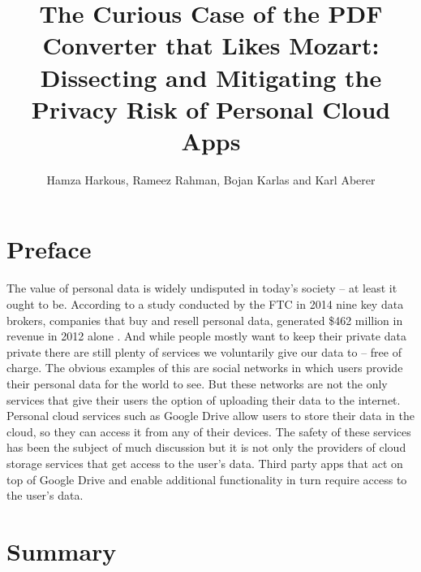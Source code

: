 \documentclass[11pt,twocolumn,a4paper,DIV=calc]{scrartcl}
\begin{document}
\title{The Curious Case of the PDF Converter that Likes Mozart: Dissecting and Mitigating the Privacy Risk of Personal Cloud Apps}
\author{Hamza Harkous, Rameez Rahman, Bojan Karlas and Karl Aberer}
\date{}
\maketitle

\section{Preface}

The value of personal data is widely undisputed in today’s society – at least it ought to be. 
According to a study conducted by the FTC in 2014 nine key data brokers, companies that buy and resell personal data, generated \$462 million in revenue in 2012 alone \cite{FTCStudy}. 
And while people mostly want to keep their private data private \cite{WorthOfData} there are still plenty of services we voluntarily give our data to – free of charge. 
The obvious examples of this are social networks in which users provide their personal data for the world to see. 
But these networks are not the only services that give their users the option of uploading their data to the internet. Personal cloud services such as Google Drive allow users to store their data in the cloud, so they can access it from any of their devices. 
The safety of these services has been the subject of much discussion \cite{CloudSecurity} but it is not only the providers of cloud storage services that get access to the user’s data. 
Third party apps that act on top of Google Drive and enable additional functionality in turn require access to the user’s data.

\section{Summary}
\end{document}
